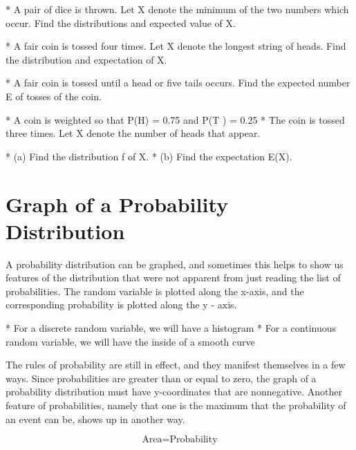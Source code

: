 \begin{enumerate}
*  A pair of dice is thrown. Let X denote the minimum of the two numbers which occur.
Find the distributions and expected value of X.

*  A fair coin is tossed four times.
Let X denote the longest string of heads.
Find the distribution and expectation of X.

*  A fair coin is tossed until a head or five tails occurs.
Find the expected number E of tosses of the coin.


*  A coin is weighted so that P(H) = 0.75 and P(T ) = 0.25
*  The coin is tossed three times. Let X denote the number of
heads that appear.
\begin{itemize}
*  (a) Find the distribution f of X.
*  (b) Find the expectation E(X).
\end{itemize}
\end{enumerate}


\section{Graph of a Probability Distribution}

A probability distribution can be graphed, and sometimes this helps to show us features of the distribution that were not apparent from just reading the list of probabilities. The random variable is plotted along the x-axis, and the corresponding probability is plotted along the y - axis.

\begin{itemize}
*  For a discrete random variable, we will have a histogram
*  For a continuous random variable, we will have the inside of a smooth curve
\end{itemize}

The rules of probability are still in effect, and they manifest themselves in a few ways. Since probabilities are greater than or equal to zero, the graph of a probability distribution must have y-coordinates that are nonnegative. Another feature of probabilities, namely that one is the maximum that the probability of an event can be, shows up in another way.

\[ \mbox{Area} = \mbox{Probability} \]





